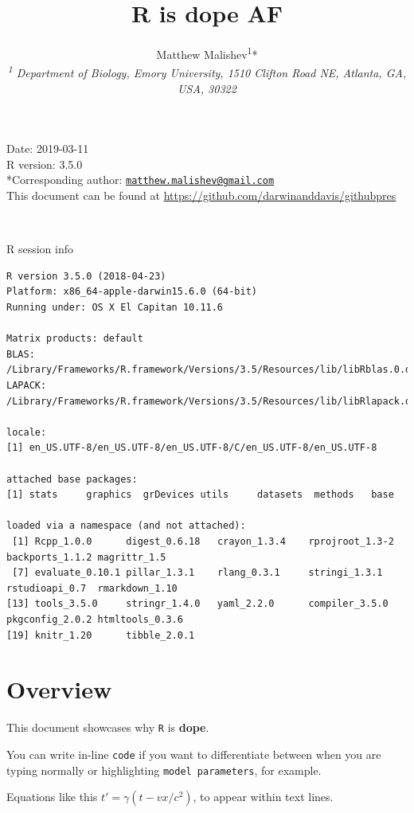 \documentclass[10,portrait]{article}
\title{R is dope AF}
\author{Matthew
Malishev\textsuperscript{1}*\\[2\baselineskip]\emph{\textsuperscript{1}
Department of Biology, Emory University, 1510 Clifton Road NE, Atlanta,
GA, USA, 30322}}
\date{}
\begin{document}
\maketitle

{
\hypersetup{linkcolor=black}
\setcounter{tocdepth}{4}
\tableofcontents
}
\newpage   

Date: 2019-03-11\\
R version: 3.5.0\\
*Corresponding author:
\href{mailto:matthew.malishev@gmail.com}{\nolinkurl{matthew.malishev@gmail.com}}\\
This document can be found at
\url{https://github.com/darwinanddavis/githubpres}

~

R session info

\begin{verbatim}
R version 3.5.0 (2018-04-23)
Platform: x86_64-apple-darwin15.6.0 (64-bit)
Running under: OS X El Capitan 10.11.6

Matrix products: default
BLAS: /Library/Frameworks/R.framework/Versions/3.5/Resources/lib/libRblas.0.dylib
LAPACK: /Library/Frameworks/R.framework/Versions/3.5/Resources/lib/libRlapack.dylib

locale:
[1] en_US.UTF-8/en_US.UTF-8/en_US.UTF-8/C/en_US.UTF-8/en_US.UTF-8

attached base packages:
[1] stats     graphics  grDevices utils     datasets  methods   base     

loaded via a namespace (and not attached):
 [1] Rcpp_1.0.0      digest_0.6.18   crayon_1.3.4    rprojroot_1.3-2 backports_1.1.2 magrittr_1.5   
 [7] evaluate_0.10.1 pillar_1.3.1    rlang_0.3.1     stringi_1.3.1   rstudioapi_0.7  rmarkdown_1.10 
[13] tools_3.5.0     stringr_1.4.0   yaml_2.2.0      compiler_3.5.0  pkgconfig_2.0.2 htmltools_0.3.6
[19] knitr_1.20      tibble_2.0.1   
\end{verbatim}

\newpage  

\section{Overview}\label{overview}

This document showcases why \texttt{R} is \textbf{dope}.

You can write in-line \texttt{code} if you want to differentiate between
when you are typing normally or highlighting \texttt{model\ parameters},
for example.

Equations like this \(t' = \gamma(t - vx/c^{2})\), to appear within text
lines.
\end{document}
